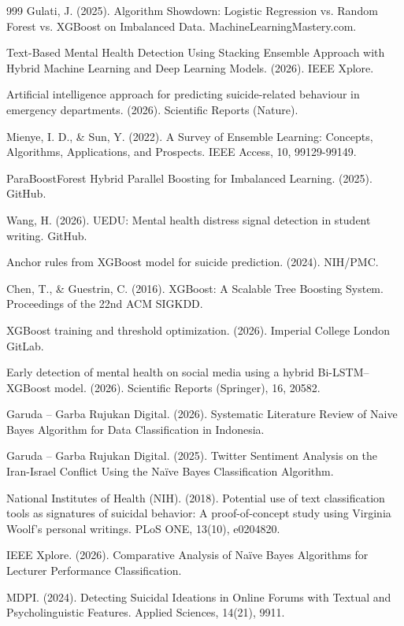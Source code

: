 \begin{thebibliography}{999}
 Gulati, J. (2025). Algorithm Showdown: Logistic Regression vs. Random Forest vs. XGBoost on Imbalanced Data. MachineLearningMastery.com.

 Text-Based Mental Health Detection Using Stacking Ensemble Approach with Hybrid Machine Learning and Deep Learning Models. (2026). IEEE Xplore.

 Artificial intelligence approach for predicting suicide-related behaviour in emergency departments. (2026). Scientific Reports (Nature).

 Mienye, I. D., \& Sun, Y. (2022). A Survey of Ensemble Learning: Concepts, Algorithms, Applications, and Prospects. IEEE Access, 10, 99129-99149.

 ParaBoostForest Hybrid Parallel Boosting for Imbalanced Learning. (2025). GitHub.

 Wang, H. (2026). UEDU: Mental health distress signal detection in student writing. GitHub.

 Anchor rules from XGBoost model for suicide prediction. (2024). NIH/PMC.

 Chen, T., \& Guestrin, C. (2016). XGBoost: A Scalable Tree Boosting System. Proceedings of the 22nd ACM SIGKDD.

 XGBoost training and threshold optimization. (2026). Imperial College London GitLab.

 Early detection of mental health on social media using a hybrid Bi-LSTM–XGBoost model. (2026). Scientific Reports (Springer), 16, 20582.

 Garuda – Garba Rujukan Digital. (2026). Systematic Literature Review of Naive Bayes Algorithm for Data Classification in Indonesia.

 Garuda – Garba Rujukan Digital. (2025). Twitter Sentiment Analysis on the Iran-Israel Conflict Using the Naïve Bayes Classification Algorithm.

 National Institutes of Health (NIH). (2018). Potential use of text classification tools as signatures of suicidal behavior: A proof-of-concept study using Virginia Woolf’s personal writings. PLoS ONE, 13(10), e0204820.

 IEEE Xplore. (2026). Comparative Analysis of Naïve Bayes Algorithms for Lecturer Performance Classification.

 MDPI. (2024). Detecting Suicidal Ideations in Online Forums with Textual and Psycholinguistic Features. Applied Sciences, 14(21), 9911.


\end{thebibliography}
